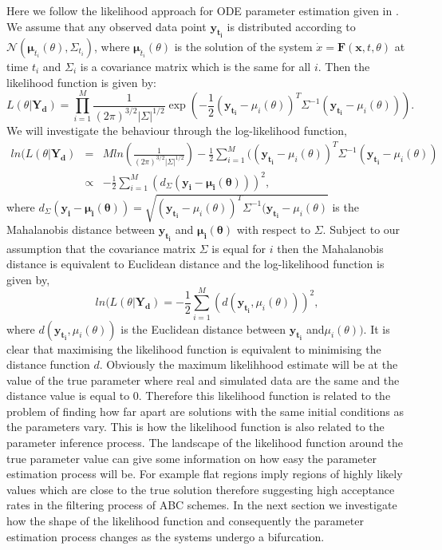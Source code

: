\documentclass[12pt,a4paper,titlepage]{article}
\begin{document}
Here we follow the likelihood approach for ODE parameter estimation given in \cite{}. We assume that any observed data point $\mathbf{y_{t_i}}$ is distributed according to $\mathcal{N}(\boldsymbol{\mu}_{t_i}(\theta), \Sigma_{t_i})$, where $\boldsymbol{\mu}_{t_i}(\theta)$ is the solution of the system $\dot x = \mathbf{F}(\mathbf{x}, t, \theta)$ at time $t_i$ and $\Sigma_i$ is a covariance matrix which is the same for all $i$. Then the likelihood function is given by:
\begin{equation}
L(\theta | \mathbf{Y_d}) = \prod_{i=1}^M \frac{1}{(2\pi)^{3/2}|\Sigma|^{1/2}} \exp \left(-\frac{1}{2}(\mathbf{y_{t_i}} - \mu_i(\theta))^{T}\Sigma^{-1}(\mathbf{y_{t_i}} - \mu_i(\theta)) \right).
\end{equation}
We will investigate the behaviour through the log-likelihood function,
\begin{equation}
\begin{array}{lcl}
ln(L(\theta|\mathbf{Y_d}) &= & M ln\left(\frac{1}{(2\pi)^{3/2}|\Sigma|^{1/2}}\right) -\frac{1}{2}\sum_{i=1}^{M}((\mathbf{y_{t_i}} - \mu_i(\theta))^{T}\Sigma^{-1}(\mathbf{y_{t_i}} - \mu_i(\theta))\\
& \propto & -\frac{1}{2}\sum_{i=1}^{M}(d_{\Sigma}(\mathbf{y_i} - \boldsymbol{\mu_i(\theta)}))^2,
\end{array}
\end{equation}
where $d_{\Sigma}(\mathbf{y_i} - \boldsymbol{\mu_i(\theta)}) = \sqrt{(\mathbf{y_{t_i}} - \mu_i(\theta))^{T}\Sigma^{-1}(\mathbf{y_{t_i}} - \mu_i(\theta)}$ is the Mahalanobis distance between $\mathbf{y_{t_i}}$ and $\boldsymbol{\mu_i(\theta)}$ with respect to $\Sigma$.  Subject to our assumption that the covariance matrix $\Sigma$ is equal for $i$ then the Mahalanobis distance is equivalent to Euclidean distance and the log-likelihood function is given by,
\begin{equation}
ln(L(\theta|\mathbf{Y_d}) = -\frac{1}{2}\sum_{i=1}^{M}(d(\mathbf{y_{t_i}}, \mu_{i}(\theta)))^2,
\end{equation}
where $d(\mathbf{y_{t_i}}, \mu_{i}(\theta))$ is the Euclidean distance between $\mathbf{y_{t_i}}$ and$\mu_{i}(\theta))$. It is clear that maximising the 
likelihood function is equivalent to minimising the distance function $d$. Obviously the maximum likelihhood estimate will be at the value of the true parameter where real and simulated data are the same and the distance value is equal to $0$. Therefore this likelihood function is related to the problem of finding how far apart are solutions with the same initial conditions as the parameters vary. This is how the likelihood function is also related to the parameter inference process. The landscape of the likelihood function around the true parameter value can give some information on how easy the parameter estimation process will be. For example flat regions imply regions of highly likely values which are close to the true solution therefore suggesting high acceptance rates in the filtering process of ABC schemes. In the next section we investigate how the shape of the likelihood function and consequently the parameter estimation process changes as the systems undergo a bifurcation.
\end{document}
